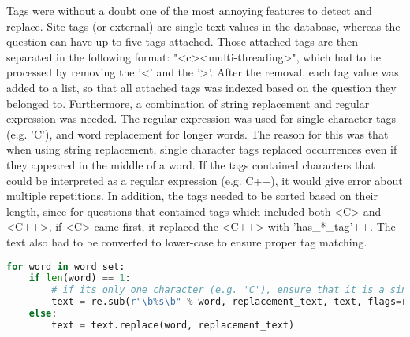 \vspace{0.5em}\newline
Tags were without a doubt one of the most annoying features to detect and replace. 
Site tags (or external) are single text values in the database, whereas the question can have up to five tags attached. 
Those attached tags are then separated in the following format: "<c><multi-threading>", which had to be processed by removing the '<' and the '>'.
After the removal, each tag value was added to a list, so that all attached tags was indexed based on the question they belonged to. 
Furthermore, a combination of string replacement and regular expression was needed. 
The regular expression was used for single character tags (e.g. 'C'), and word replacement for longer words.
The reason for this was that when using string replacement, single character tags replaced occurrences even if they appeared in the middle of a word.
If the tags contained characters that could be interpreted as a regular expression (e.g. C++), it would give error about multiple repetitions.
In addition, the tags needed to be sorted based on their length, since for questions that contained tags which included both <C> and <C++>, 
if <C> came first, it replaced the <C++> with 'has\_*\_tag'++. The text also had to be converted to lower-case to ensure proper tag matching. 

\begin{lstlisting}[caption={Replacing tags in the question}, 
label={lst:pandas_categorical}, language={Python}, basicstyle=\small] 
for word in word_set:
	if len(word) == 1:
		# if its only one character (e.g. 'C'), ensure that it is a singular word by using regex
		text = re.sub(r"\b%s\b" % word, replacement_text, text, flags=re.IGNORECASE)
	else:
		text = text.replace(word, replacement_text)
\end{lstlisting}

